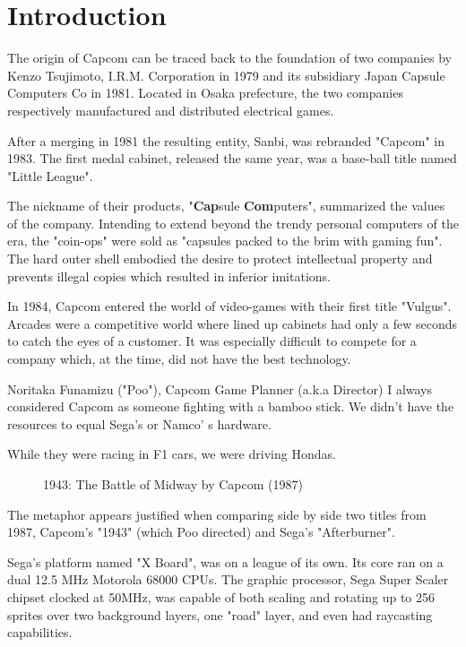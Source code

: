 \chapter{Introduction} 

The origin of Capcom can be traced back to the foundation of two companies by Kenzo Tsujimoto, I.R.M. Corporation in 1979 and its subsidiary Japan Capsule Computers Co in 1981. Located in Osaka prefecture, the two companies respectively manufactured and distributed electrical games.

After a merging in 1981 the resulting entity, Sanbi, was rebranded "Capcom" in 1983. The first medal cabinet, released the same year, was a base-ball title named "Little League".

The nickname of their products, "\textbf{Cap}sule \textbf{Com}puters", summarized the values of the company. Intending to extend beyond the trendy personal computers of the era, the "coin-ops" were sold as "capsules packed to the brim with gaming fun". The hard outer shell embodied the desire to protect intellectual property and prevents illegal copies which resulted in inferior imitations.


 In 1984, Capcom entered the world of video-games with their first title "Vulgus".
Arcades were a competitive world where lined up cabinets had only a few seconds to catch the eyes of a customer. It was especially difficult to compete for a company which, at the time, did not have the best technology.

\begin{q}{Noritaka Funamizu ("Poo"), Capcom Game Planner (a.k.a Director\cite{planner})}
I always considered Capcom as someone fighting with a bamboo stick. We didn't have the resources to equal Sega's or Namco'
s hardware. 

While they were racing in F1 cars, we were driving Hondas.
\end{q}


\begin{figure}[H]
\caption*{1943: The Battle of Midway by Capcom (1987)}
\end{figure}

The metaphor appears justified when comparing side by side two titles from 1987, Capcom's "1943" (which Poo directed) and Sega's "Afterburner".

Sega's platform named "X Board", was on a league of its own. Its core ran on a dual 12.5 MHz Motorola 68000 CPUs. The graphic processor, Sega Super Scaler chipset clocked at 50MHz, was capable of both scaling and rotating up to 256 sprites over two background layers, one "road" layer, and even had raycasting capabilities. 

